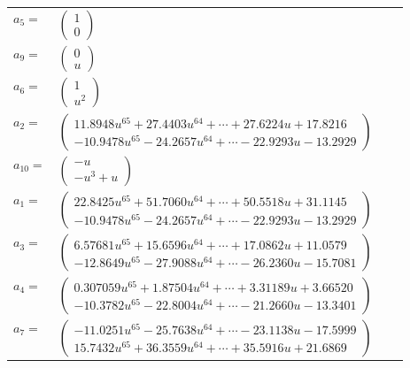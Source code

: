 \documentclass[1p]{elsarticle_modified}
\theoremstyle{definition}
\begin{document}
\begin{tabular}{m{7pt} m{180pt} m{7pt} m{180pt} }
\flushright $a_{5}=$&$\begin{pmatrix}1\\0\end{pmatrix}$ \\
\flushright $a_{9}=$&$\begin{pmatrix}0\\u\end{pmatrix}$ \\
\flushright $a_{6}=$&$\begin{pmatrix}1\\u^2\end{pmatrix}$ \\
\flushright $a_{2}=$&$\begin{pmatrix}11.8948 u^{65}+27.4403 u^{64}+\cdots+27.6224 u+17.8216\\-10.9478 u^{65}-24.2657 u^{64}+\cdots-22.9293 u-13.2929\end{pmatrix}$ \\
\flushright $a_{10}=$&$\begin{pmatrix}- u\\- u^3+u\end{pmatrix}$ \\
\flushright $a_{1}=$&$\begin{pmatrix}22.8425 u^{65}+51.7060 u^{64}+\cdots+50.5518 u+31.1145\\-10.9478 u^{65}-24.2657 u^{64}+\cdots-22.9293 u-13.2929\end{pmatrix}$ \\
\flushright $a_{3}=$&$\begin{pmatrix}6.57681 u^{65}+15.6596 u^{64}+\cdots+17.0862 u+11.0579\\-12.8649 u^{65}-27.9088 u^{64}+\cdots-26.2360 u-15.7081\end{pmatrix}$ \\
\flushright $a_{4}=$&$\begin{pmatrix}0.307059 u^{65}+1.87504 u^{64}+\cdots+3.31189 u+3.66520\\-10.3782 u^{65}-22.8004 u^{64}+\cdots-21.2660 u-13.3401\end{pmatrix}$ \\
\flushright $a_{7}=$&$\begin{pmatrix}-11.0251 u^{65}-25.7638 u^{64}+\cdots-23.1138 u-17.5999\\15.7432 u^{65}+36.3559 u^{64}+\cdots+35.5916 u+21.6869\end{pmatrix}$ \\

\end{tabular}
\end{document}
